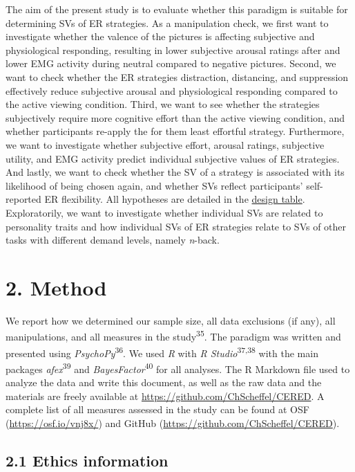 \documentclass[
  english,
  man,floatsintext]{apa6}
\begin{document}
The aim of the present study is to evaluate whether this paradigm is suitable for determining SVs of ER strategies.
As a manipulation check, we first want to investigate whether the valence of the pictures is affecting subjective and physiological responding, resulting in lower subjective arousal ratings after and lower EMG activity during neutral compared to negative pictures.
Second, we want to check whether the ER strategies distraction, distancing, and suppression effectively reduce subjective arousal and physiological responding compared to the active viewing condition.
Third, we want to see whether the strategies subjectively require more cognitive effort than the active viewing condition, and whether participants re-apply the for them least effortful strategy.
Furthermore, we want to investigate whether subjective effort, arousal ratings, subjective utility, and EMG activity predict individual subjective values of ER strategies.
And lastly, we want to check whether the SV of a strategy is associated with its likelihood of being chosen again, and whether SVs reflect participants' self-reported ER flexibility.
All hypotheses are detailed in the \protect\hyperlink{DesignTable}{design table}.
Exploratorily, we want to investigate whether individual SVs are related to personality traits and how individual SVs of ER strategies relate to SVs of other tasks with different demand levels, namely \emph{n}-back.

\hypertarget{method}{%
\section{2. Method}\label{method}}

We report how we determined our sample size, all data exclusions (if any), all manipulations, and all measures in the study\textsuperscript{35}.
The paradigm was written and presented using \emph{PsychoPy}\textsuperscript{36}.
We used \emph{R} with \emph{R Studio}\textsuperscript{37,38} with the main packages \emph{afex}\textsuperscript{39} and \emph{BayesFactor}\textsuperscript{40} for all analyses.
The R Markdown file used to analyze the data and write this document, as well as the raw data and the materials are freely available at \url{https://github.com/ChScheffel/CERED}.
A complete list of all measures assessed in the study can be found at OSF (\url{https://osf.io/vnj8x/}) and GitHub (\url{https://github.com/ChScheffel/CERED}).

\hypertarget{ethics-information}{%
\subsection{2.1 Ethics information}\label{ethics-information}}
\end{document}
